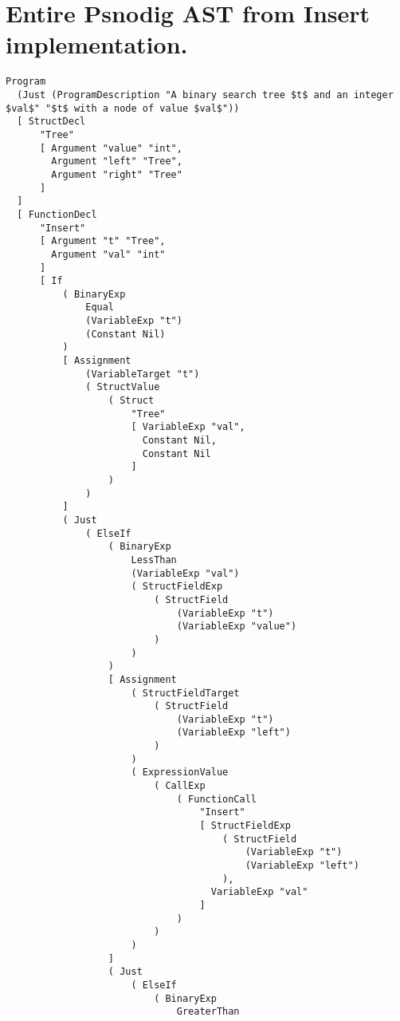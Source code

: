 \section{Entire Psnodig AST from Insert implementation.}
\label{appendix:Entire Psnodig AST from Insert implementation.}

\begin{lstlisting}
Program
  (Just (ProgramDescription "A binary search tree $t$ and an integer $val$" "$t$ with a node of value $val$"))
  [ StructDecl
      "Tree"
      [ Argument "value" "int",
        Argument "left" "Tree",
        Argument "right" "Tree"
      ]
  ]
  [ FunctionDecl
      "Insert"
      [ Argument "t" "Tree",
        Argument "val" "int"
      ]
      [ If
          ( BinaryExp
              Equal
              (VariableExp "t")
              (Constant Nil)
          )
          [ Assignment
              (VariableTarget "t")
              ( StructValue
                  ( Struct
                      "Tree"
                      [ VariableExp "val",
                        Constant Nil,
                        Constant Nil
                      ]
                  )
              )
          ]
          ( Just
              ( ElseIf
                  ( BinaryExp
                      LessThan
                      (VariableExp "val")
                      ( StructFieldExp
                          ( StructField
                              (VariableExp "t")
                              (VariableExp "value")
                          )
                      )
                  )
                  [ Assignment
                      ( StructFieldTarget
                          ( StructField
                              (VariableExp "t")
                              (VariableExp "left")
                          )
                      )
                      ( ExpressionValue
                          ( CallExp
                              ( FunctionCall
                                  "Insert"
                                  [ StructFieldExp
                                      ( StructField
                                          (VariableExp "t")
                                          (VariableExp "left")
                                      ),
                                    VariableExp "val"
                                  ]
                              )
                          )
                      )
                  ]
                  ( Just
                      ( ElseIf
                          ( BinaryExp
                              GreaterThan

\end{lstlisting}
